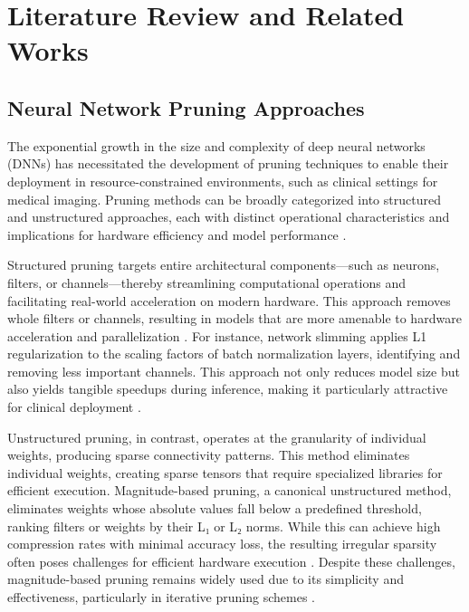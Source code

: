 \documentclass[12pt,a4paper]{article}
\begin{document}
\section{Literature Review and Related Works}

\subsection{Neural Network Pruning Approaches}

The exponential growth in the size and complexity of deep neural networks (DNNs) has necessitated the development of pruning techniques to enable their deployment in resource-constrained environments, such as clinical settings for medical imaging. Pruning methods can be broadly categorized into structured and unstructured approaches, each with distinct operational characteristics and implications for hardware efficiency and model performance \cite{Liu2023Survey, Yang2025, Mazurek2024}.

Structured pruning targets entire architectural components—such as neurons, filters, or channels—thereby streamlining computational operations and facilitating real-world acceleration on modern hardware. This approach removes whole filters or channels, resulting in models that are more amenable to hardware acceleration and parallelization \cite{Liu2023Survey, Mazurek2024}. For instance, network slimming applies L1 regularization to the scaling factors of batch normalization layers, identifying and removing less important channels. This approach not only reduces model size but also yields tangible speedups during inference, making it particularly attractive for clinical deployment \cite{Liu2023Survey, Mazurek2024}.

Unstructured pruning, in contrast, operates at the granularity of individual weights, producing sparse connectivity patterns. This method eliminates individual weights, creating sparse tensors that require specialized libraries for efficient execution. Magnitude-based pruning, a canonical unstructured method, eliminates weights whose absolute values fall below a predefined threshold, ranking filters or weights by their L₁ or L₂ norms. While this can achieve high compression rates with minimal accuracy loss, the resulting irregular sparsity often poses challenges for efficient hardware execution \cite{Wu2023, Ragab2024}. Despite these challenges, magnitude-based pruning remains widely used due to its simplicity and effectiveness, particularly in iterative pruning schemes \cite{Liu2023Survey, Wu2023}.
\end{document}
